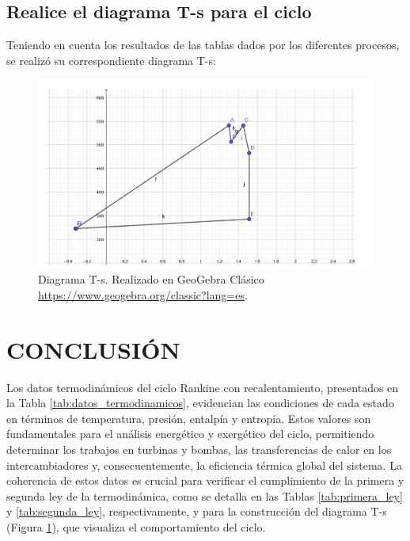 \documentclass[conference]{IEEEtran}
\theoremstyle{mytheoremstyle}
\theoremstyle{mytheoremstyle}
\theoremstyle{myproblemstyle}
\begin{document}
\subsection*{Realice el diagrama T-s para el ciclo} 
Teniendo en cuenta los resultados de las tablas dados por los diferentes procesos, se realizó su correspondiente diagrama T-s:
\begin{figure}[ht!]
    \centering
    \includegraphics[width=1\textwidth]{Ts_diagram.png} %
    \caption{Diagrama T-s. Realizado en GeoGebra Clásico \protect\url{https://www.geogebra.org/classic?lang=es}.}
    \label{fig:t-s-diagram}
\end{figure}



\newpage
\clearpage %
\newpage
\clearpage %


\section*{CONCLUSIÓN}
Los datos termodinámicos del ciclo Rankine con recalentamiento, presentados en la Tabla \ref{tab:datos_termodinamicos}, evidencian las condiciones de cada estado en términos de temperatura, presión, entalpía y entropía. Estos valores son fundamentales para el análisis energético y exergético del ciclo, permitiendo determinar los trabajos en turbinas y bombas, las transferencias de calor en los intercambiadores y, consecuentemente, la eficiencia térmica global del sistema. La coherencia de estos datos es crucial para verificar el cumplimiento de la primera y segunda ley de la termodinámica, como se detalla en las Tablas \ref{tab:primera_ley} y \ref{tab:segunda_ley}, respectivamente, y para la construcción del diagrama T-s (Figura \ref{fig:t-s-diagram}), que visualiza el comportamiento del ciclo.
\quad
\end{document}
